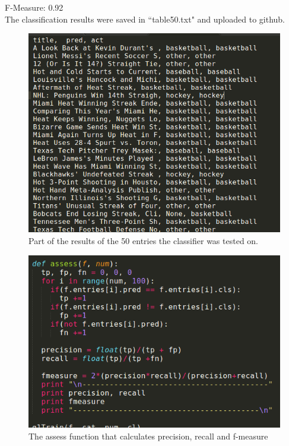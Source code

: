 \documentclass{article}
\begin{document}
F-Measure: 0.92\\
The classification results were saved in ``table50.txt" and uploaded to github.
\begin{figure} [H]
 \centering
 \includegraphics[height = 10 cm]{res1.png}
 \caption{Part of the results of the 50 entries the classifier was tested on.}
\end{figure}


\begin{figure} [H]
 \centering
 \includegraphics[height = 10 cm]{assfun.png}
 \caption{The assess function that calculates precision, recall and f-measure}
\end{figure}


\end{document}
